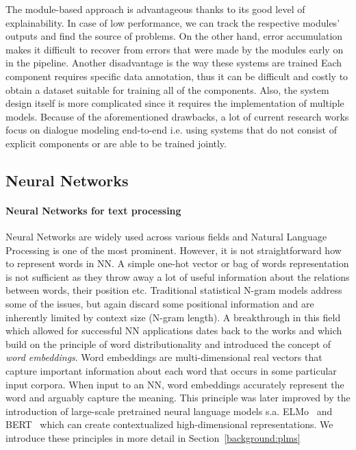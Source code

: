 The module-based approach is advantageous thanks to its good level of explainability.
In case of low performance, we can track the respective modules' outputs and find the source of problems.
On the other hand, error accumulation makes it difficult to recover from errors that were made by the modules early on in the pipeline.
Another disadvantage is the way these systems are trained \cite{li-etal-2017-end}
Each component requires specific data annotation, thus it can be difficult and costly to obtain a dataset suitable for training all of the components.
Also, the system design itself is more complicated since it requires the implementation of multiple models.
Because of the aforementioned drawbacks, a lot of current research works focus on dialogue modeling end-to-end i.e. using systems that do not consist of explicit components or are able to be trained jointly.

\subsection{Neural Networks}
\label{background:nns}
\cite{GoodBengCour16}
\paragraph{Neural Networks for text processing}
Neural Networks are widely used across various fields and Natural Language Processing is one of the most prominent.
However, it is not straightforward how to represent words in NN.
A simple one-hot vector or bag of words representation is not sufficient as they throw away a lot of useful information about the relations between words, their position etc.
Traditional statistical N-gram models \cite{jurafsky2000speech} address some of the issues, but again discard some positional information and are inherently limited by context size (N-gram length).
A breakthrough in this field which allowed for successful NN applications dates back to the works \citep{mikolov2010recurrent} and \citep{mikolov2013distributed} which build on the principle of word distributionality and introduced the concept of \emph{word embeddings}.
Word embeddings are multi-dimensional real vectors that capture important information about each word that occurs in some particular input corpora.
When input to an NN, word embeddings accurately represent the word and arguably capture the meaning.
This principle was later improved by the introduction of large-scale pretrained neural language models s.a. ELMo~\cite{peters-etal-2018-deep} and BERT~\cite{devlin2019} which can create contextualized high-dimensional representations.
We introduce these principles in more detail in Section~\ref{background:plms}


